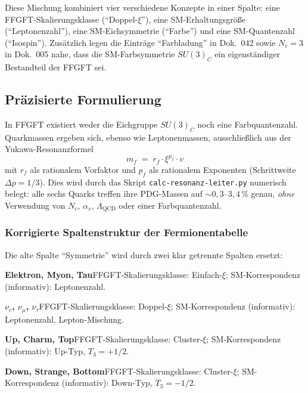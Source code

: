 \medskip


Diese Mischung kombiniert vier verschiedene Konzepte in einer Spalte:
eine FFGFT-Skalierungsklasse (\enquote{Doppel-$\xi$}), eine
SM-Erhaltungsgröße (\enquote{Leptonenzahl}), eine SM-Eichsymmetrie
(\enquote{Farbe}) und eine SM-Quantenzahl (\enquote{Isospin}).
Zusätzlich legen die Einträge \enquote{Farbladung} in Dok.~042 sowie
$N_c = 3$ in Dok.~005 nahe, dass die SM-Farbsymmetrie $SU(3)_C$ ein
eigenständiger Bestandteil der FFGFT sei.

\subsection*{Präzisierte Formulierung}

In FFGFT existiert weder die Eichgruppe $SU(3)_C$ noch eine
Farbquantenzahl. Quarkmassen ergeben sich, ebenso wie Leptonenmassen,
ausschließlich aus der Yukawa-Resonanzformel
\begin{equation}
  m_f \;=\; r_f \cdot \xi^{p_f} \cdot v
  \tag{190.13}
\end{equation}
mit $r_f$ als rationalem Vorfaktor und $p_f$ als rationalem Exponenten
(Schrittweite $\Delta p = 1/3$). Dies wird durch das Skript
\texttt{calc-resonanz-leiter.py} numerisch belegt: alle sechs Quarks
treffen ihre PDG-Massen auf $\sim 0{,}3\text{--}3{,}4\,\%$ genau,
\emph{ohne} Verwendung von $N_c$, $\alpha_s$, $\Lambda_{\text{QCD}}$
oder einer Farbquantenzahl.

\subsubsection*{Korrigierte Spaltenstruktur der Fermionentabelle}

Die alte Spalte \enquote{Symmetrie} wird durch zwei klar getrennte
Spalten ersetzt:

\smallskip\noindent \textbf{Elektron, Myon, Tau}\quad FFGFT-Skalierungsklasse: Einfach-$\xi$; SM-Korrespondenz (informativ): Leptonenzahl.

\smallskip\noindent \textbf{$\nu_e$, $\nu_\mu$, $\nu_\tau$}\quad FFGFT-Skalierungsklasse: Doppel-$\xi$; SM-Korrespondenz (informativ): Leptonenzahl, Lepton-Mischung.

\smallskip\noindent \textbf{Up, Charm, Top}\quad FFGFT-Skalierungsklasse: Cluster-$\xi$; SM-Korrespondenz (informativ): Up-Typ, $T_3 = +1/2$.

\smallskip\noindent \textbf{Down, Strange, Bottom}\quad FFGFT-Skalierungsklasse: Cluster-$\xi$; SM-Korrespondenz (informativ): Down-Typ, $T_3 = -1/2$.

